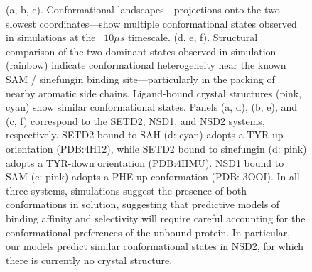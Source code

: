 \documentclass[12pt]{article}
\begin{document}
\begin{figure}
\caption{
(a, b, c).  Conformational landscapes---projections onto the two slowest coordinates---show multiple conformational states observed in simulations at the ~$10 \mu s$ timescale.  (d, e, f). Structural comparison of the two dominant states observed in simulation (rainbow) indicate conformational heterogeneity near the known SAM / sinefungin binding site---particularly in the packing of nearby aromatic side chains.  Ligand-bound crystal structures (pink, cyan) show similar conformational states.  Panels (a, d), (b, e), and (c, f) correspond to the SETD2, NSD1, and NSD2 systems, respectively.  SETD2 bound to SAH (d: cyan) adopts a TYR-up orientation (PDB:4H12), while SETD2 bound to sinefungin (d: pink) adopts a TYR-down orientation (PDB:4HMU).  NSD1 bound to SAM (e: pink) adopts a PHE-up conformation (PDB: 3OOI).  In all three systems, simulations suggest the presence of both conformations in solution, suggesting that predictive models of binding affinity and selectivity will require careful accounting for the conformational preferences of the unbound protein.  In particular, our models predict similar conformational states in NSD2, for which there is currently no crystal structure.
}
\label{figure:MSM}
\end{figure}
\end{document}
